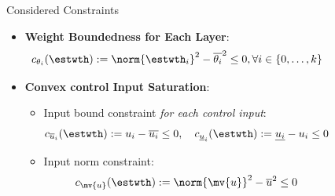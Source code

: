 \begin{frame}{\insertsubsectionhead}{}
\begin{columns}
  {
    \begin{block}{Considered Constraints}

      \begin{itemize}
        \item \textbf{Weight Boundedness for Each Layer}: 
          \begin{equation}\label{eq:cstr:weight}
            c_{\theta_i}(\estwth)
            :=
            \norm{\estwth_i}^2 - \overline{\theta_i}^2 \le 0
            , 
            \forall i\in\{0,\ldots,k\}
          \end{equation}

        \item \textbf{Convex control Input Saturation}: 
          \begin{itemize}
            \item Input bound constraint \textit{for each control input}:
            \begin{equation}\label{eq:cstr:input_bound}
              c_{\overline{u}_i}(\estwth)
              :=
              u_i - \overline{u_i}
              \le 
              0
              ,
              \quad
              c_{\underline{u}_i}(\estwth)
              :=
              \underline{u_i} - u_i
              \le 
              0
            \end{equation}
            \item Input norm constraint:
            \begin{equation}\label{eq:cstr:input_norm}
              c_{\mv{u}}(\estwth)
              :=
              \norm{\mv{u}}^2 - \overline{u}^2
              \le
              0
            \end{equation}
        \end{itemize}
      \end{itemize}
      
    \end{block}
  }

  \end{columns}

\end{frame}


